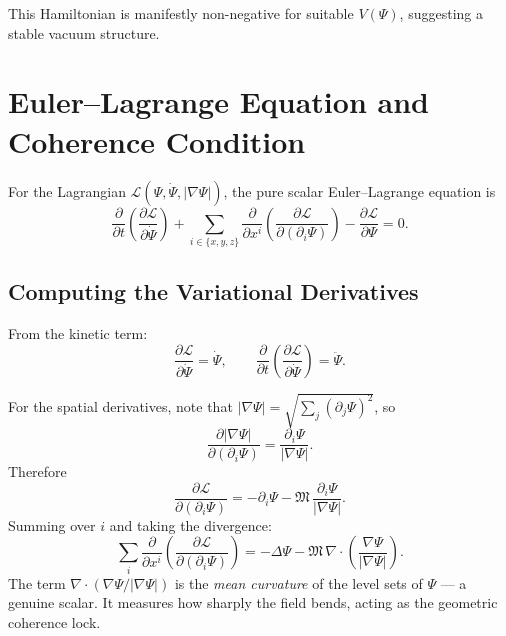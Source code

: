 \documentclass[11pt,a4paper]{article}
\theoremstyle{definition}
\theoremstyle{plain}
\newcommand{\M}{\mathfrak{M}}
\newcommand{\Lag}{\mathcal{L}}
\begin{document}
This Hamiltonian is manifestly non-negative for suitable $V(\Psi)$, suggesting a stable vacuum structure.

\section{Euler--Lagrange Equation and Coherence Condition}\label{sec:el}

For the Lagrangian $\Lag(\Psi, \dot{\Psi}, |\nabla\Psi|)$, the pure scalar Euler--Lagrange equation is
\begin{equation}\label{eq:el-general}
\frac{\partial}{\partial t}\!\left(\frac{\partial \Lag}{\partial \dot{\Psi}}\right)
+
\sum_{i \in \{x,y,z\}} \frac{\partial}{\partial x^{i}}\!\left(\frac{\partial \Lag}{\partial(\partial_{i}\Psi)}\right)
-
\frac{\partial \Lag}{\partial \Psi}
= 0.
\end{equation}

\subsection{Computing the Variational Derivatives}

From the kinetic term:
\begin{equation}
\frac{\partial \Lag}{\partial \dot{\Psi}} = \dot{\Psi}, \qquad
\frac{\partial}{\partial t}\!\left(\frac{\partial \Lag}{\partial \dot{\Psi}}\right) = \ddot{\Psi}.
\end{equation}

For the spatial derivatives, note that $|\nabla\Psi| = \sqrt{\sum_{j}(\partial_{j}\Psi)^{2}}$, so
\begin{equation}
\frac{\partial |\nabla\Psi|}{\partial(\partial_{i}\Psi)} = \frac{\partial_{i}\Psi}{|\nabla\Psi|}.
\end{equation}
Therefore
\begin{equation}
\frac{\partial \Lag}{\partial(\partial_{i}\Psi)}
= -\partial_{i}\Psi - \M\,\frac{\partial_{i}\Psi}{|\nabla\Psi|}.
\end{equation}
Summing over $i$ and taking the divergence:
\begin{equation}
\sum_{i} \frac{\partial}{\partial x^{i}}\!\left(\frac{\partial \Lag}{\partial(\partial_{i}\Psi)}\right)
= -\Delta\Psi - \M\,\nabla \cdot \left(\frac{\nabla\Psi}{|\nabla\Psi|}\right).
\end{equation}
The term $\nabla \cdot (\nabla\Psi / |\nabla\Psi|)$ is the \emph{mean curvature} of the level sets of $\Psi$ --- a genuine scalar. It measures how sharply the field bends, acting as the geometric coherence lock.
\end{document}
